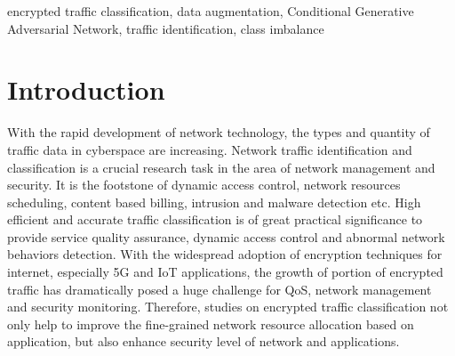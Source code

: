 \documentclass[conference]{IEEEtran}
\begin{document}
\begin{IEEEkeywords}
encrypted traffic classification, data augmentation, Conditional Generative Adversarial Network, traffic identification, class imbalance
\end{IEEEkeywords}


\section{Introduction}\label{sec:intro} %
With the rapid development of network technology, the types and quantity of traffic data in cyberspace are increasing. Network traffic identification and classification is a crucial research task in the area of network management and security. It is the footstone of dynamic access control, network resources scheduling, content based billing, intrusion and malware detection etc. High efficient and accurate traffic classification is of great practical significance to provide service quality assurance, dynamic access control and abnormal network behaviors detection. With the widespread adoption of encryption techniques for internet, especially 5G and IoT applications, the growth of portion of encrypted traffic has dramatically posed a huge challenge for QoS, network management and security monitoring. Therefore, studies on encrypted traffic classification not only help to improve the fine-grained network resource allocation based on application, but also enhance security level of network and applications.
\end{document}

